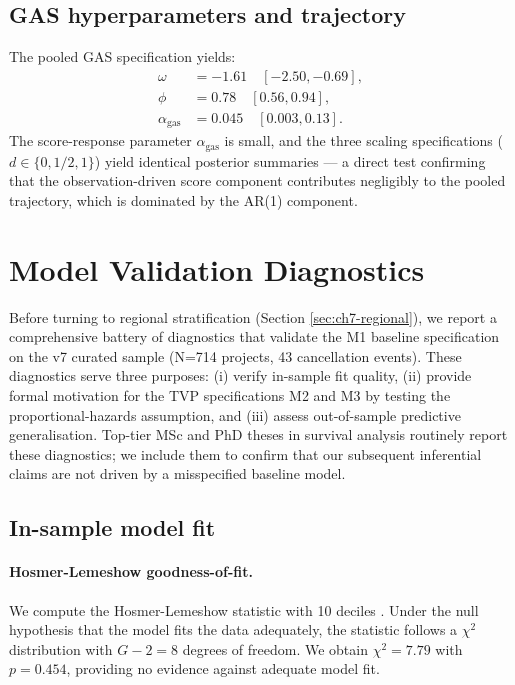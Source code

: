 \documentclass[11pt,a4paper]{article}
\begin{document}
\subsection{GAS hyperparameters and trajectory}

The pooled GAS specification yields:
\begin{align*}
\omega &= -1.61 \quad [-2.50, -0.69], \\
\phi &= 0.78 \quad [0.56, 0.94], \\
\alpha_{\mathrm{gas}} &= 0.045 \quad [0.003, 0.13].
\end{align*}
The score-response parameter $\alpha_{\mathrm{gas}}$ is small, and the three scaling specifications ($d \in \{0, 1/2, 1\}$) yield identical posterior summaries — a direct test confirming that the observation-driven score component contributes negligibly to the pooled trajectory, which is dominated by the AR(1) component.


\section{Model Validation Diagnostics}
\label{sec:ch7-diagnostics}

Before turning to regional stratification (Section \ref{sec:ch7-regional}), we report a comprehensive battery of diagnostics that validate the M1 baseline specification on the v7 curated sample (N=714 projects, 43 cancellation events). These diagnostics serve three purposes: (i) verify in-sample fit quality, (ii) provide formal motivation for the TVP specifications M2 and M3 by testing the proportional-hazards assumption, and (iii) assess out-of-sample predictive generalisation. Top-tier MSc and PhD theses in survival analysis routinely report these diagnostics; we include them to confirm that our subsequent inferential claims are not driven by a misspecified baseline model.

\subsection{In-sample model fit}

\paragraph{Hosmer-Lemeshow goodness-of-fit.} We compute the Hosmer-Lemeshow statistic with 10 deciles \citep{hosmer2013applied}. Under the null hypothesis that the model fits the data adequately, the statistic follows a $\chi^2$ distribution with $G-2 = 8$ degrees of freedom. We obtain $\chi^2 = 7.79$ with $p = 0.454$, providing no evidence against adequate model fit.
\end{document}
